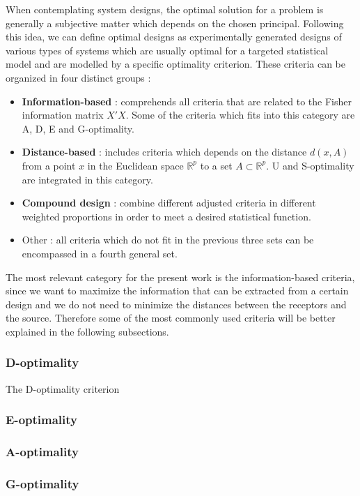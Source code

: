 When contemplating system designs, the optimal solution for a problem is generally a subjective matter which depends on the chosen principal. Following this idea, we can define optimal designs as experimentally generated designs of various types of systems which are usually optimal for a targeted statistical model and are modelled by a specific optimality criterion. These criteria can be organized in four distinct groups \cite{compare-optimality-crit}:
\begin{itemize}
	\item \textbf{Information-based} : comprehends all criteria that are related to the Fisher information matrix $X'X$. Some of the criteria which fits into this category are A, D, E and G-optimality.
	\item \textbf{Distance-based} : includes criteria which depends on the distance $d(x,A)$ from a point $x$ in the Euclidean space $\mathbb{R}^{p}$ to a set $A \subset \mathbb{R}^{p}$. U and S-optimality are integrated in this category.
	\item \textbf{Compound design} : combine different adjusted criteria in different weighted proportions in order to meet a desired statistical function.
	\item Other : all criteria which do not fit in the previous three sets can be encompassed in a fourth general set.
\end{itemize}

The most relevant category for the present work is the information-based criteria, since we want to maximize the information that can be extracted from a certain design and we do not need to minimize the distances between the receptors and the source. Therefore some of the most commonly used criteria will be better explained in the following subsections.

\subsubsection{D-optimality}
The D-optimality criterion 

\subsubsection{E-optimality}

\subsubsection{A-optimality}

\subsubsection{G-optimality}